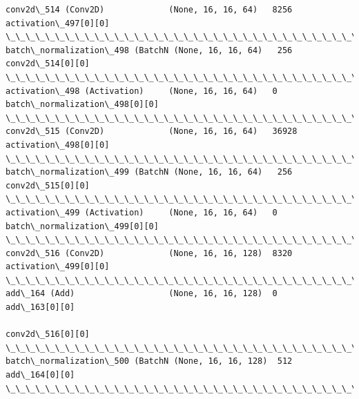 \documentclass[11pt]{article}
\begin{document}
\begin{Verbatim}[commandchars=\\\{\}]
conv2d\_514 (Conv2D)             (None, 16, 16, 64)   8256        activation\_497[0][0]             
\_\_\_\_\_\_\_\_\_\_\_\_\_\_\_\_\_\_\_\_\_\_\_\_\_\_\_\_\_\_\_\_\_\_\_\_\_\_\_\_\_\_\_\_\_\_\_\_\_\_\_\_\_\_\_\_\_\_\_\_\_\_\_\_\_\_\_\_\_\_\_\_\_\_\_\_\_\_\_\_\_\_\_\_\_\_\_\_\_\_\_\_\_\_\_\_\_\_
batch\_normalization\_498 (BatchN (None, 16, 16, 64)   256         conv2d\_514[0][0]                 
\_\_\_\_\_\_\_\_\_\_\_\_\_\_\_\_\_\_\_\_\_\_\_\_\_\_\_\_\_\_\_\_\_\_\_\_\_\_\_\_\_\_\_\_\_\_\_\_\_\_\_\_\_\_\_\_\_\_\_\_\_\_\_\_\_\_\_\_\_\_\_\_\_\_\_\_\_\_\_\_\_\_\_\_\_\_\_\_\_\_\_\_\_\_\_\_\_\_
activation\_498 (Activation)     (None, 16, 16, 64)   0           batch\_normalization\_498[0][0]    
\_\_\_\_\_\_\_\_\_\_\_\_\_\_\_\_\_\_\_\_\_\_\_\_\_\_\_\_\_\_\_\_\_\_\_\_\_\_\_\_\_\_\_\_\_\_\_\_\_\_\_\_\_\_\_\_\_\_\_\_\_\_\_\_\_\_\_\_\_\_\_\_\_\_\_\_\_\_\_\_\_\_\_\_\_\_\_\_\_\_\_\_\_\_\_\_\_\_
conv2d\_515 (Conv2D)             (None, 16, 16, 64)   36928       activation\_498[0][0]             
\_\_\_\_\_\_\_\_\_\_\_\_\_\_\_\_\_\_\_\_\_\_\_\_\_\_\_\_\_\_\_\_\_\_\_\_\_\_\_\_\_\_\_\_\_\_\_\_\_\_\_\_\_\_\_\_\_\_\_\_\_\_\_\_\_\_\_\_\_\_\_\_\_\_\_\_\_\_\_\_\_\_\_\_\_\_\_\_\_\_\_\_\_\_\_\_\_\_
batch\_normalization\_499 (BatchN (None, 16, 16, 64)   256         conv2d\_515[0][0]                 
\_\_\_\_\_\_\_\_\_\_\_\_\_\_\_\_\_\_\_\_\_\_\_\_\_\_\_\_\_\_\_\_\_\_\_\_\_\_\_\_\_\_\_\_\_\_\_\_\_\_\_\_\_\_\_\_\_\_\_\_\_\_\_\_\_\_\_\_\_\_\_\_\_\_\_\_\_\_\_\_\_\_\_\_\_\_\_\_\_\_\_\_\_\_\_\_\_\_
activation\_499 (Activation)     (None, 16, 16, 64)   0           batch\_normalization\_499[0][0]    
\_\_\_\_\_\_\_\_\_\_\_\_\_\_\_\_\_\_\_\_\_\_\_\_\_\_\_\_\_\_\_\_\_\_\_\_\_\_\_\_\_\_\_\_\_\_\_\_\_\_\_\_\_\_\_\_\_\_\_\_\_\_\_\_\_\_\_\_\_\_\_\_\_\_\_\_\_\_\_\_\_\_\_\_\_\_\_\_\_\_\_\_\_\_\_\_\_\_
conv2d\_516 (Conv2D)             (None, 16, 16, 128)  8320        activation\_499[0][0]             
\_\_\_\_\_\_\_\_\_\_\_\_\_\_\_\_\_\_\_\_\_\_\_\_\_\_\_\_\_\_\_\_\_\_\_\_\_\_\_\_\_\_\_\_\_\_\_\_\_\_\_\_\_\_\_\_\_\_\_\_\_\_\_\_\_\_\_\_\_\_\_\_\_\_\_\_\_\_\_\_\_\_\_\_\_\_\_\_\_\_\_\_\_\_\_\_\_\_
add\_164 (Add)                   (None, 16, 16, 128)  0           add\_163[0][0]                    
                                                                 conv2d\_516[0][0]                 
\_\_\_\_\_\_\_\_\_\_\_\_\_\_\_\_\_\_\_\_\_\_\_\_\_\_\_\_\_\_\_\_\_\_\_\_\_\_\_\_\_\_\_\_\_\_\_\_\_\_\_\_\_\_\_\_\_\_\_\_\_\_\_\_\_\_\_\_\_\_\_\_\_\_\_\_\_\_\_\_\_\_\_\_\_\_\_\_\_\_\_\_\_\_\_\_\_\_
batch\_normalization\_500 (BatchN (None, 16, 16, 128)  512         add\_164[0][0]                    
\_\_\_\_\_\_\_\_\_\_\_\_\_\_\_\_\_\_\_\_\_\_\_\_\_\_\_\_\_\_\_\_\_\_\_\_\_\_\_\_\_\_\_\_\_\_\_\_\_\_\_\_\_\_\_\_\_\_\_\_\_\_\_\_\_\_\_\_\_\_\_\_\_\_\_\_\_\_\_\_\_\_\_\_\_\_\_\_\_\_\_\_\_\_\_\_\_\_

\end{Verbatim}
\end{document}
